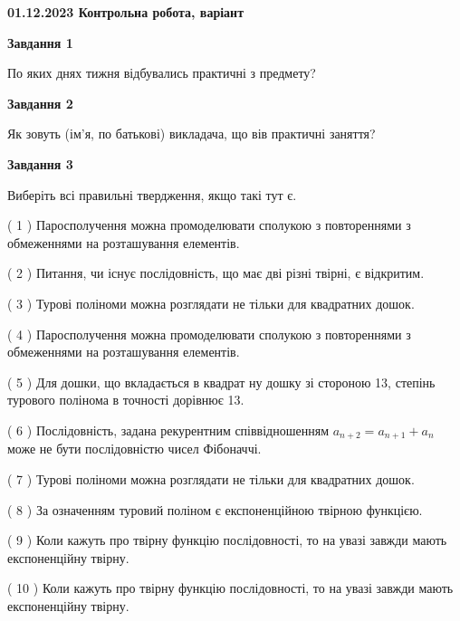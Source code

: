 \documentclass[12pt, ukrainian]{article}
\begin{document}
\begin {large}

\textbf{01.12.2023 Контрольна робота, варіант  }\par


{
{\begin {center}\textbf{Завдання 1}\end {center}}\par
По яких днях тижня відбувались практичні з предмету?\par
{\begin {center}\textbf{Завдання 2}\end {center}}\par
Як зовуть (ім'я, по батькові) викладача, що вів практичні заняття?\par
{\begin {center}\textbf{Завдання 3}\end {center}}\par
Виберіть всі правильні твердження, якщо такі тут є.\par
\vspace{2mm}
( 1 ) Паросполучення можна промоделювати сполукою з повтореннями з обмеженнями на розташування елементів.%

( 2 ) Питання, чи існує послідовність, що має дві різні твірні, є відкритим.%

( 3 ) Турові поліноми можна розглядати не тільки для квадратних дошок.%

( 4 ) Паросполучення можна промоделювати сполукою з повтореннями з обмеженнями на розташування елементів.%

( 5 ) Для дошки, що вкладається в квадрат ну дошку зі стороною 13, степінь турового полінома в точності дорівнює 13.%

( 6 ) Послідовність, задана рекурентним співвідношенням $a_{n+2}=a_{n+1}+a_{n}$ може не бути послідовністю чисел Фібоначчі.%

( 7 ) Турові поліноми можна розглядати не тільки для квадратних дошок.%

( 8 ) За означенням туровий поліном є експоненційною твірною функцією.%

( 9 ) Коли кажуть про твірну функцію послідовності, то на увазі завжди мають експоненційну твірну.%

( 10 ) Коли кажуть про твірну функцію послідовності, то на увазі завжди мають експоненційну твірну.%
}
\end {large}

\vspace{4mm}
\newpage
\end{document}
